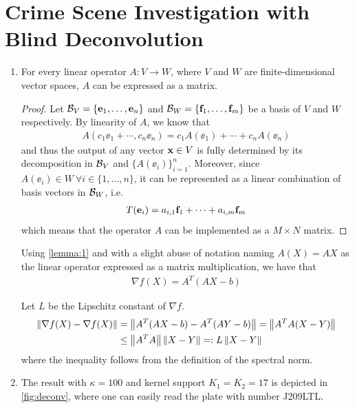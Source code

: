 \documentclass{article}
\begin{document}
\section{Crime Scene Investigation with Blind Deconvolution}
\begin{enumerate}[label=(\alph*)]
    \item
    \begin{lemma}
        For every linear operator $A:V\to W$, where $V$ and $W$ are finite-dimensional vector spaces, $A$ can be expressed as a matrix.
        \label{lemma:1}
    \end{lemma}
    \begin{proof}
        Let $\mathcal{B}_V=\{\mathbf{e}_1,\dots,\mathbf{e}_n\}$ and $\mathcal{B}_W=\{\mathbf{f}_1,\dots,\mathbf{f}_m\}$ be a basis of $V$ and $W$ respectively. By linearity of $A$, we know that
        \begin{align}
            A(c_1 \ee_1 + \cdots, c_n \ee_n) = c_1A(\ee_1) + \cdots + c_n A(\ee_n)
        \end{align}
        and thus the output of any vector $\mathbf{x} \in V$ is fully determined by its decomposition in $\mathcal{B}_V$ and $\{A(\ee_i)\}_{i=1}^n$. Moreover, since $A(\ee_i)\in W \ \forall i\in\{1,\dots,n\}$, it can be represented as a linear combination of basis vectors in $\mathcal{B}_W$, i.e.
        \begin{align}
            T(\mathbf{e}_i)=a_{i,1}\mathbf{f}_1+\cdots+ a_{i,m}\mathbf{f}_m
        \end{align}
        which means that the operator $A$ can be implemented as a $M\times N$ matrix.
    \end{proof}
    
    Using \autoref{lemma:1} and with a slight abuse of notation naming $A(X)=AX$ as the linear operator expressed as a matrix multiplication, we have that
    \begin{align}
        \nabla f(X) = A^T (AX - b)
    \end{align}
    
    Let $L$ be the Lipschitz constant of $\nabla f$.
    \begin{align}
        \left\lVert\nabla f(X) - \nabla f(X)\right\rVert &= \left\lVert A^T (AX - b) - A^T (AY - b)\right\rVert=\left\lVert A^TA(X - Y)\right\rVert \\
        &\leq \left\lVert A^T A\right\rVert \left\lVert X-Y\right\rVert =: L \left\lVert X-Y\right\rVert
    \end{align}
    where the inequality follows from the definition of the spectral norm.
    \item  The result with $\kappa=100$ and kernel support $K_1=K_2=17$ is depicted in \autoref{fig:deconv}, where one can easily read the plate with number J209LTL.
\end{enumerate}
\end{document}
